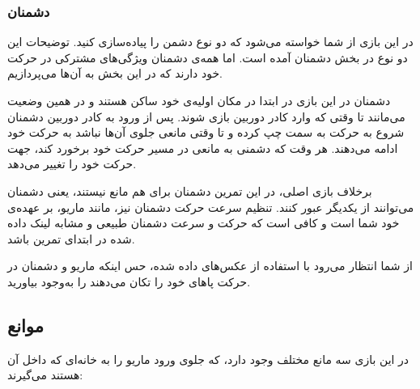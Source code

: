 \documentclass{utap}
\begin{document}
		\subsubsection{دشمنان}
در این بازی از شما خواسته می‌شود که دو نوع دشمن را پیاده‌سازی کنید. توضیحات این دو نوع در بخش دشمنان آمده است. اما همه‌ی دشمنان ویژگی‌های مشترکی در حرکت خود دارند که در این بخش به آن‌ها می‌پردازیم.

دشمنان در این بازی در ابتدا در مکان اولیه‌ی خود ساکن هستند و در همین وضعیت می‌مانند تا وقتی که وارد کادر دوربین بازی شوند. پس از ورود به کادر دوربین دشمنان شروع به حرکت به سمت چپ کرده و تا وقتی مانعی جلو‌ی آن‌ها نباشد به حرکت خود ادامه می‌دهند. هر وقت که دشمنی به مانعی در مسیر حرکت خود برخورد کند، جهت حرکت خود را تغییر می‌دهد.

برخلاف بازی اصلی، در این تمرین دشمنان برای هم مانع نیستند، یعنی دشمنان می‌توانند از یکدیگر عبور کنند. تنظیم سرعت حرکت دشمنان نیز، مانند ماریو، بر عهده‌ی خود شما است و کافی است که حرکت و سرعت دشمنان طبیعی و مشابه لینک داده شده در ابتدای تمرین باشد.

از شما انتظار می‌رود با استفاده از عکس‌های داده شده، حس اینکه ماریو و دشمنان در حرکت پاهای خود را تکان می‌دهند را به‌وجود بیاورید.

	\subsection{موانع}
در این بازی سه مانع مختلف وجود دارد، که جلوی ورود ماریو را به خانه‌ای که داخل آن هستند می‌گیرند:
\end{document}
